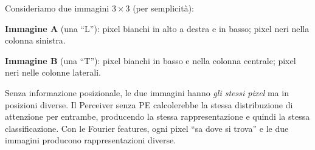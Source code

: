 \documentclass[12pt,a4paper]{article}
\begin{document}
\begin{examplebox}
Consideriamo due immagini $3 \times 3$ (per semplicit\`a):

\textbf{Immagine A} (una ``L''): pixel bianchi in alto a destra e in basso; pixel neri nella colonna sinistra.

\textbf{Immagine B} (una ``T''): pixel bianchi in basso e nella colonna centrale; pixel neri nelle colonne laterali.

Senza informazione posizionale, le due immagini hanno \emph{gli stessi pixel} ma in posizioni diverse. Il Perceiver senza PE calcolerebbe la stessa distribuzione di attenzione per entrambe, producendo la stessa rappresentazione e quindi la stessa classificazione. Con le Fourier features, ogni pixel ``sa dove si trova'' e le due immagini producono rappresentazioni diverse.
\end{examplebox}
\end{document}
